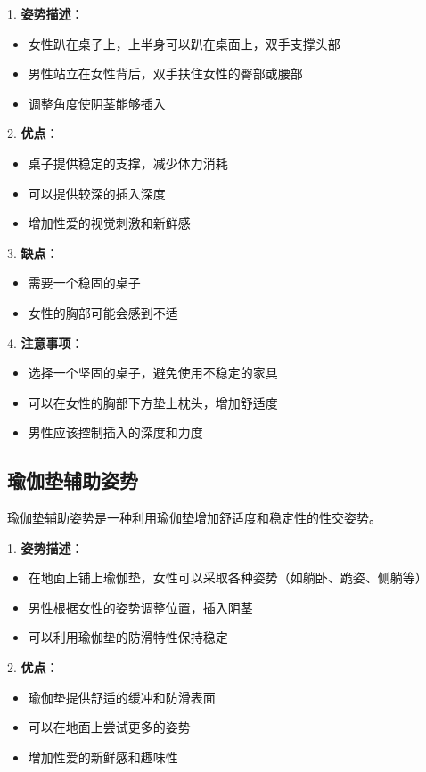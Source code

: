 \documentclass[12pt,UTF8]{ctexbook}
\begin{document}
1. \textbf{姿势描述}：
  \begin{itemize}
  \item 女性趴在桌子上，上半身可以趴在桌面上，双手支撑头部
  \item 男性站立在女性背后，双手扶住女性的臀部或腰部
  \item 调整角度使阴茎能够插入
  \end{itemize}

2. \textbf{优点}：
  \begin{itemize}
  \item 桌子提供稳定的支撑，减少体力消耗
  \item 可以提供较深的插入深度
  \item 增加性爱的视觉刺激和新鲜感
  \end{itemize}

3. \textbf{缺点}：
  \begin{itemize}
  \item 需要一个稳固的桌子
  \item 女性的胸部可能会感到不适
  \end{itemize}

4. \textbf{注意事项}：
  \begin{itemize}
  \item 选择一个坚固的桌子，避免使用不稳定的家具
  \item 可以在女性的胸部下方垫上枕头，增加舒适度
  \item 男性应该控制插入的深度和力度
  \end{itemize}

\subsection{瑜伽垫辅助姿势}

瑜伽垫辅助姿势是一种利用瑜伽垫增加舒适度和稳定性的性交姿势。

1. \textbf{姿势描述}：
  \begin{itemize}
  \item 在地面上铺上瑜伽垫，女性可以采取各种姿势（如躺卧、跪姿、侧躺等）
  \item 男性根据女性的姿势调整位置，插入阴茎
  \item 可以利用瑜伽垫的防滑特性保持稳定
  \end{itemize}

2. \textbf{优点}：
  \begin{itemize}
  \item 瑜伽垫提供舒适的缓冲和防滑表面
  \item 可以在地面上尝试更多的姿势
  \item 增加性爱的新鲜感和趣味性
  \end{itemize}
\end{document}
